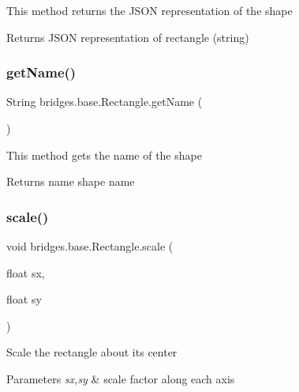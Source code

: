 This method returns the J\+S\+ON representation of the shape

\begin{DoxyReturn}{Returns}
J\+S\+ON representation of rectangle (string) 
\end{DoxyReturn}
\mbox{\label{classbridges_1_1base_1_1_rectangle_ab785b45f264ae3cd61a5a898ffa6afba}} 
\subsubsection{\texorpdfstring{getName()}{getName()}}
{\footnotesize\ttfamily String bridges.\+base.\+Rectangle.\+get\+Name (\begin{DoxyParamCaption}{ }\end{DoxyParamCaption})}

This method gets the name of the shape

\begin{DoxyReturn}{Returns}
name shape name 
\end{DoxyReturn}
\mbox{\label{classbridges_1_1base_1_1_rectangle_ad2612f09cf16cd829efd13007df53f7f}} 
\subsubsection{\texorpdfstring{scale()}{scale()}}
{\footnotesize\ttfamily void bridges.\+base.\+Rectangle.\+scale (\begin{DoxyParamCaption}\item[{float}]{sx,  }\item[{float}]{sy }\end{DoxyParamCaption})}

Scale the rectangle about its center


\begin{DoxyParams}{Parameters}
{\em sx,sy} & scale factor along each axis \\
\hline
\end{DoxyParams}
\mbox{\label{classbridges_1_1base_1_1_rectangle_a267eafb8107ea074598fbf4d2d3dc72d}} 
